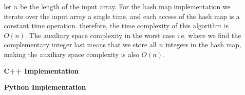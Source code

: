 \Complexity
let $n$ be the length of the input array. For the hash map implementation we iterate over the input array a single time, and each access of the hash map is a constant time operation. therefore, the time complexity of this algorithm is \(O(n)\). The auxiliary space complexity in the worst case i.e. where we find the complementary integer last means that we store all $n$ integers in the hash map, making the auxiliary space complexity is also \(O(n)\).

\bigskip
\noindent\textbf{C++ Implementation}



\bigskip
\noindent\textbf{Python Implementation}



\ProblemDivider
